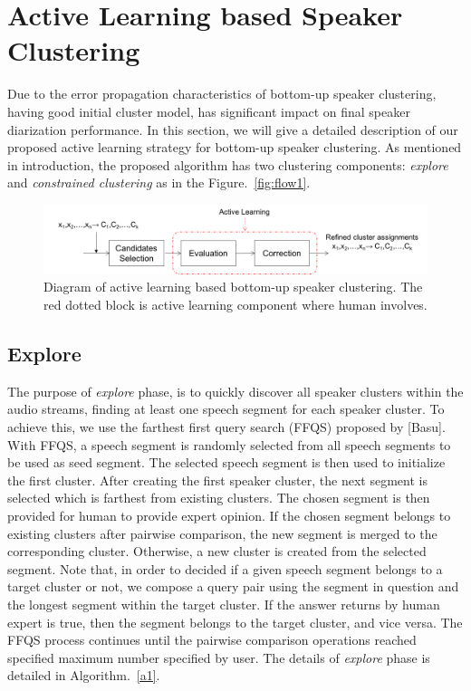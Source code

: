 \documentclass[journal]{IEEEtran}
\begin{document}
\section{Active Learning based Speaker Clustering}
Due to the error propagation characteristics of bottom-up speaker clustering, having good initial cluster model, has significant impact on final speaker diarization performance. In this section, we will give a detailed description of our proposed active learning strategy for bottom-up speaker clustering. As mentioned in introduction, the proposed algorithm has two clustering components: \textit{explore} and \textit{constrained clustering} as in the Figure.~\ref{fig:flow1}.

\begin{figure}
	\centering
	\includegraphics[width=\linewidth]{figs/flow6}
	\caption{Diagram of active learning based bottom-up speaker clustering. The red dotted block is active learning component where human involves.}
	\label{fig:flow2}
\end{figure}

\subsection{Explore}
The purpose of \textit{explore} phase, is to quickly discover all speaker clusters within the audio streams, finding at least one speech segment for each speaker cluster. To achieve this, we use the farthest first query search (FFQS) proposed by [Basu]. With FFQS, a speech segment is randomly selected from all speech segments to be used as seed segment. The selected speech segment is then used to initialize the first cluster. After creating the first speaker cluster, the next segment is selected which is farthest from existing clusters. The chosen segment is then provided for human to provide expert opinion. If the chosen segment belongs to existing clusters after pairwise comparison, the new segment is merged to the corresponding cluster. Otherwise, a new cluster is created from the selected segment. Note that, in order to decided if a given speech segment belongs to a target cluster or not, we compose a query pair using the segment in question and the longest segment within the target cluster. If the answer returns by human expert is true, then the segment belongs to the target cluster, and vice versa. The FFQS process continues until the pairwise comparison operations reached specified maximum number specified by user. The details of \textit{explore} phase is detailed in Algorithm.~\ref{a1}.  
\end{document}

